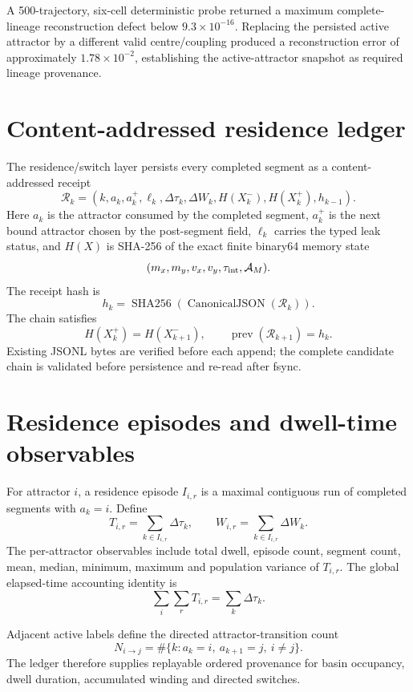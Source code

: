 \documentclass[11pt]{book}
\begin{document}
A 500-trajectory, six-cell deterministic probe returned a maximum complete-lineage reconstruction defect below \(9.3\times10^{-16}\). Replacing the persisted active attractor by a different valid centre/coupling produced a reconstruction error of approximately \(1.78\times10^{-2}\), establishing the active-attractor snapshot as required lineage provenance.

\section{Content-addressed residence ledger}

The residence/switch layer persists every completed segment as a content-addressed receipt
\[
\boxed{
\mathcal R_k=
\left(
 k,a_k,a_k^+,\ell_k,
 \Delta\tau_k,\Delta W_k,
 H(X_k^-),H(X_k^+),h_{k-1}
\right).
}
\]
Here \(a_k\) is the attractor consumed by the completed segment, \(a_k^+\) is the next bound attractor chosen by the post-segment field, \(\ell_k\) carries the typed leak status, and \(H(X)\) is SHA-256 of the exact finite binary64 memory state
\[
(m_x,m_y,v_x,v_y,\tau_{\rm int},\mathcal A_M).
\]
The receipt hash is
\[
\boxed{
h_k=\operatorname{SHA256}\!\left(\operatorname{CanonicalJSON}(\mathcal R_k)\right).
}
\]
The chain satisfies
\[
\boxed{H(X_k^+)=H(X_{k+1}^-)},
\qquad
\boxed{\operatorname{prev}(\mathcal R_{k+1})=h_k.}
\]
Existing JSONL bytes are verified before each append; the complete candidate chain is validated before persistence and re-read after fsync.

\section{Residence episodes and dwell-time observables}

For attractor \(i\), a residence episode \(I_{i,r}\) is a maximal contiguous run of completed segments with \(a_k=i\). Define
\[
\boxed{
T_{i,r}=\sum_{k\in I_{i,r}}\Delta\tau_k,
}
\qquad
\boxed{
W_{i,r}=\sum_{k\in I_{i,r}}\Delta W_k.
}
\]
The per-attractor observables include total dwell, episode count, segment count, mean, median, minimum, maximum and population variance of \(T_{i,r}\). The global elapsed-time accounting identity is
\[
\boxed{
\sum_i\sum_rT_{i,r}=\sum_k\Delta\tau_k.
}
\]

Adjacent active labels define the directed attractor-transition count
\[
\boxed{
N_{i\to j}
=\#\{k:a_k=i,\ a_{k+1}=j,\ i\neq j\}.
}
\]
The ledger therefore supplies replayable ordered provenance for basin occupancy, dwell duration, accumulated winding and directed switches.
\end{document}
